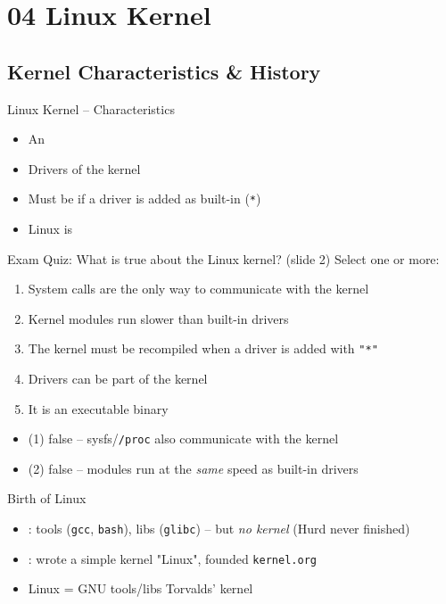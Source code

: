 \section{04 Linux Kernel}

\subsection{Kernel Characteristics \& History}

\begin{concept}{Linux Kernel -- Characteristics}
    \begin{itemize}
        \item An 
        \item Drivers  of the kernel
        \item Must be  if a driver is added as built-in (\texttt{*})
        \item Linux is 
    \end{itemize}
\end{concept}

\begin{example2}{Exam Quiz: What is true about the Linux kernel? (slide 2)}
    Select one or more:
    \begin{enumerate}
        \item System calls are the only way to communicate with the kernel
        \item Kernel modules run slower than built-in drivers
        \item The kernel must be recompiled when a driver is added with \texttt{"*"}
        \item Drivers can be part of the kernel
        \item It is an executable binary
    \end{enumerate}
    \tcblower
    \begin{itemize}
        \item (1) false -- sysfs/\texttt{/proc} also communicate with the kernel
        \item (2) false -- modules run at the \emph{same} speed as built-in drivers
    \end{itemize}
\end{example2}

\begin{definition}{Birth of Linux}
    \begin{itemize}
        \item {}: tools (\texttt{gcc}, \texttt{bash}), libs (\texttt{glibc})
              -- but \emph{no kernel} (Hurd never finished)
        \item {}: wrote a simple  kernel
              "Linux", founded \texttt{kernel.org}
        \item Linux = GNU tools/libs \important{+} Torvalds' kernel
    \end{itemize}
\end{definition}

